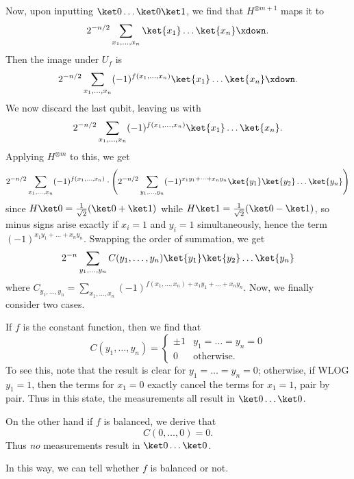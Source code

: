 \begin{problem}
\begin{sol}
		Now, upon inputting $\ket0 \dots \ket0 \ket1$, we find that $H^{\otimes m+1}$ maps it to
		\[ 2^{-n/2} \sum_{x_1, \dots, x_n} \ket{x_1} \dots \ket{x_n} \xdown.  \]
		Then the image under $U_f$ is
		\[ 2^{-n/2} \sum_{x_1, \dots, x_n} (-1)^{f(x_1, \dots, x_n)} \ket{x_1} \dots \ket{x_n} \xdown.  \]
		We now discard the last qubit, leaving us with
		\[ 2^{-n/2} \sum_{x_1, \dots, x_n} (-1)^{f(x_1, \dots, x_n)} \ket{x_1} \dots \ket{x_n}.  \]
		Applying $H^{\otimes m}$ to this, we get
		\[ 2^{-n/2} \sum_{x_1, \dots, x_n} (-1)^{f(x_1, \dots, x_n)}
			\cdot
			\left(
			2^{-n/2}
			\sum_{y_1, \dots, y_n}
			(-1)^{x_1 y_1 + \dots + x_n y_n}
			\ket{y_1} \ket{y_2} \dots \ket{y_n}
			\right)
		\]
		since $H\ket0 = \frac{1}{\sqrt2}(\ket0+\ket1)$
		while $H\ket1 = \frac{1}{\sqrt2}(\ket0-\ket1)$,
		so minus signs arise exactly if $x_i = 1$ and $y_i = 1$ simultaneously,
		hence the term $(-1)^{x_1 y_1 + \dots + x_n y_n}$.
		Swapping the order of summation, we get
		\[
			2^{-n}
			\sum_{y_1, \dots, y_n}
			C(y_1, \dots, y_n)
			\ket{y_1} \ket{y_2} \dots \ket{y_n}
		\]
		where $C_{y_1, \dots, y_n}
		= \sum_{x_1, \dots, x_n} (-1)^{f(x_1, \dots, x_n)
			+x_1 y_1 + \dots + x_n y_n}$.
		Now, we finally consider two cases.
		\begin{itemize}
			\ii If $f$ is the constant function, then we find that
			\[
				C(y_1, \dots, y_n) =
				\begin{cases}
					\pm 1 &  y_1 = \dots = y_n = 0 \\
					0 & \text{otherwise}.
				\end{cases}
			\]
			To see this, note that the result is clear for $y_1 = \dots = y_n = 0$;
			otherwise, if WLOG $y_1 = 1$, then the terms for $x_1 = 0$ exactly cancel
			the terms for $x_1 = 1$, pair by pair.
			Thus in this state, the measurements all result in $\ket0 \dots \ket0$.

			\ii On the other hand if $f$ is balanced, we derive that
			\[ C(0, \dots, 0) = 0. \]
			Thus \emph{no} measurements result in $\ket 0 \dots \ket 0$.
		\end{itemize}
		In this way, we can tell whether $f$ is balanced or not.
	\end{sol}
\end{problem}

